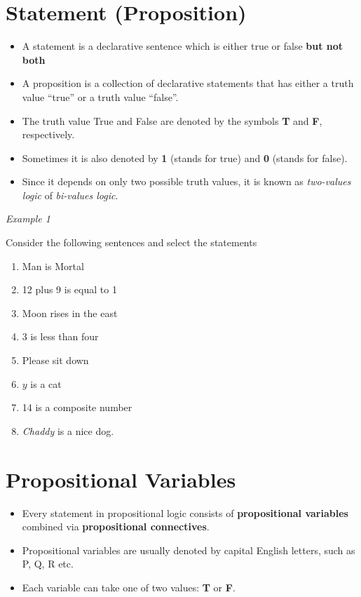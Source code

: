 \documentclass[]{book}
\providecommand{\tightlist}{%
  \setlength{\itemsep}{0pt}\setlength{\parskip}{0pt}}
\begin{document}
\hypertarget{statement-proposition}{%
\section{Statement (Proposition)}\label{statement-proposition}}

\begin{itemize}
\tightlist
\item
  A statement is a declarative sentence which is either true or false \textbf{but not both}
\item
  A proposition is a collection of declarative statements that has either a truth value ``true'' or a truth value ``false''.
\item
  The truth value True and False are denoted by the symbols \textbf{T} and \textbf{F}, respectively.
\item
  Sometimes it is also denoted by \textbf{1} (stands for true) and \textbf{0} (stands for false).
\item
  Since it depends on only two possible truth values, it is known as \emph{two-values logic} of \emph{bi-values logic}.
\end{itemize}

\emph{Example 1}

Consider the following sentences and select the statements

\begin{enumerate}
\def\labelenumi{(\alph{enumi})}
\tightlist
\item
  Man is Mortal 
\item
  12 plus 9 is equal to 1 
\item
  Moon rises in the east 
\item
  3 is less than four
\item
  Please sit down
\item
  \(y\) is a cat 
\item
  14 is a composite number 
\item
  \emph{Chaddy} is a nice dog.
\end{enumerate}

\hypertarget{propositional-variables}{%
\section{Propositional Variables}\label{propositional-variables}}

\begin{itemize}
\tightlist
\item
  Every statement in propositional logic consists
  of \textbf{propositional variables} combined via
  \textbf{propositional connectives}.
\item
  Propositional variables are usually denoted by capital English letters, such as P, Q, R etc.
\item
  Each variable can take one of two values: \textbf{T} or \textbf{F}.
\end{itemize}
\end{document}
